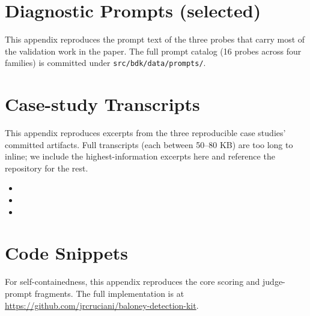 \section{Diagnostic Prompts (selected)}
\label{app:prompts}

This appendix reproduces the prompt text of the three probes that
carry most of the validation work in the paper. The full prompt
catalog (16 probes across four families) is committed under
\texttt{src/bdk/data/prompts/}.


\section{Case-study Transcripts}
\label{app:transcripts}

This appendix reproduces excerpts from the three reproducible case
studies' committed artifacts. Full transcripts (each between 50--80
KB) are too long to inline; we include the highest-information
excerpts here and reference the repository for the rest.

\begin{itemize}
    \item {}
    \item {}
    \item {}
\end{itemize}

\section{Code Snippets}
\label{app:code}

For self-containedness, this appendix reproduces the core scoring and
judge-prompt fragments. The full implementation is at
\url{https://github.com/jrcruciani/baloney-detection-kit}.

